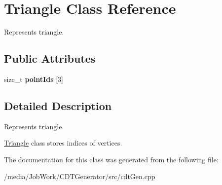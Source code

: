 \hypertarget{classTriangle}{\section{Triangle Class Reference}
\label{classTriangle}
}


Represents triangle.  


\subsection*{Public Attributes}
\begin{DoxyCompactItemize}
\item 
\hypertarget{classTriangle_ae79cc46a950e803ccf18ea92ec8d3da2}{size\-\_\-t {\bfseries point\-Ids} \mbox{[}3\mbox{]}}\label{classTriangle_ae79cc46a950e803ccf18ea92ec8d3da2}

\end{DoxyCompactItemize}


\subsection{Detailed Description}
Represents triangle. 

\hyperlink{classTriangle}{Triangle} class stores indices of vertices. 

The documentation for this class was generated from the following file\-:\begin{DoxyCompactItemize}
\item 
/media/\-Job\-Work/\-C\-D\-T\-Generator/src/cdt\-Gen.\-cpp\end{DoxyCompactItemize}
